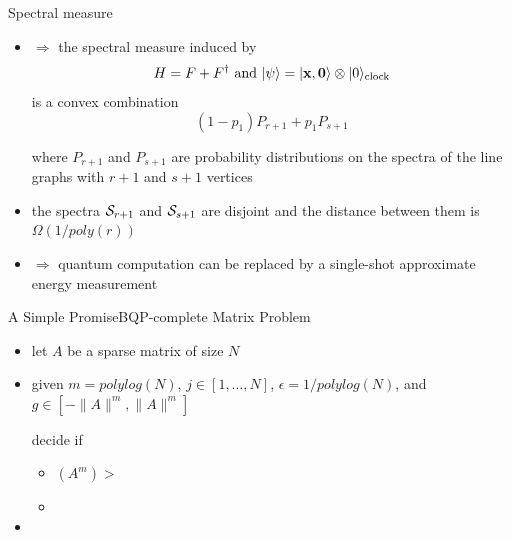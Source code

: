 \documentclass[slideColor]{prosper}
\renewcommand{\>}{\rangle}
\newcommand{\<}{\langle}
\begin{document}

\begin{slide}{Spectral measure}

\begin{itemize}
\item $\Rightarrow$ the spectral measure induced by 
\[
H=F+F^\dagger \mbox{ and } |\psi\>=|{\bf x},{\bf 0}\>\otimes |0\>_{\rm clock}
\]
is a convex combination 
\[
(1-p_1) P_{r+1} + p_1 P_{s+1}
\]

where $P_{r+1}$ and $P_{s+1}$ are probability distributions on the spectra of the line graphs with $r+1$ and $s+1$ vertices

\medskip
\item the spectra ${\cal S}_{r+1}$ and ${\cal S}_{s+1}$ are disjoint and the distance between them is $\Omega(1/poly(r))$

\medskip 
\item 
$\Rightarrow$ quantum computation can be replaced by a single-shot approximate energy measurement
\end{itemize}
\end{slide}


\begin{slide}{A Simple PromiseBQP-complete Matrix Problem}

\begin{itemize}
\item let $A$ be a sparse matrix of size $N$

\medskip
\item given 
$m=polylog(N)$,
$j\in [1,\ldots,N]$,
$\epsilon=1/polylog(N)$, and 
$g\in [ - \|A\|^m, \|A\|^m ]$ 

decide if
\begin{itemize}
\item $(A^m)>$

\item 
\end{itemize}
\item
\end{itemize}

\end{slide}

\end{document}
